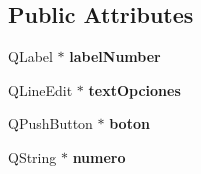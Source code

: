 \subsection*{Public Attributes}
\begin{DoxyCompactItemize}
\item 
\hypertarget{class_numero_ae868309035237d255665cc47e11f358e}{Q\-Label $\ast$ {\bfseries label\-Number}}\label{class_numero_ae868309035237d255665cc47e11f358e}

\item 
\hypertarget{class_numero_a05c25be5d0eec99f68ecee2d362a1006}{Q\-Line\-Edit $\ast$ {\bfseries text\-Opciones}}\label{class_numero_a05c25be5d0eec99f68ecee2d362a1006}

\item 
\hypertarget{class_numero_a72aae20a1d5d8722c9da4fa8e97d4efc}{Q\-Push\-Button $\ast$ {\bfseries boton}}\label{class_numero_a72aae20a1d5d8722c9da4fa8e97d4efc}

\item 
\hypertarget{class_numero_a47f3d0b00a7f0c276326be98accb8afa}{Q\-String $\ast$ {\bfseries numero}}\label{class_numero_a47f3d0b00a7f0c276326be98accb8afa}

\end{DoxyCompactItemize}


